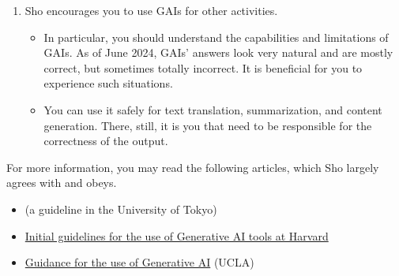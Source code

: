 \documentclass[11pt,pdfa,lastpage,minititle]{MishoNote}
\begin{document}
\begin{enumerate}
\begin{itemize}
  \end{itemize}
  \item Sho encourages you to use GAIs for other activities.
  \begin{itemize}
     \item In particular, you should understand the capabilities and limitations of GAIs. As of June 2024, GAIs' answers look very natural and are mostly correct, but sometimes totally incorrect. It is beneficial for you to experience such situations.
     \item You can use it safely for text translation, summarization, and content generation. There, still, it is you that need to be responsible for the correctness of the output.
  \end{itemize}
\end{enumerate}
For more information, you may read the following articles, which Sho largely agrees with and obeys.
\begin{itemize}
 \item \href{https://utelecon.adm.u-tokyo.ac.jp/docs/ai-tools-in-classes}{} (a guideline in the University of Tokyo)
 \item \href{https://huit.harvard.edu/ai/guidelines}{Initial guidelines for the use of Generative AI tools at Harvard}
 \item \href{https://teaching.ucla.edu/resources/ai_guidance/}{Guidance for the use of Generative AI} (UCLA)
\end{itemize}
\end{document}
